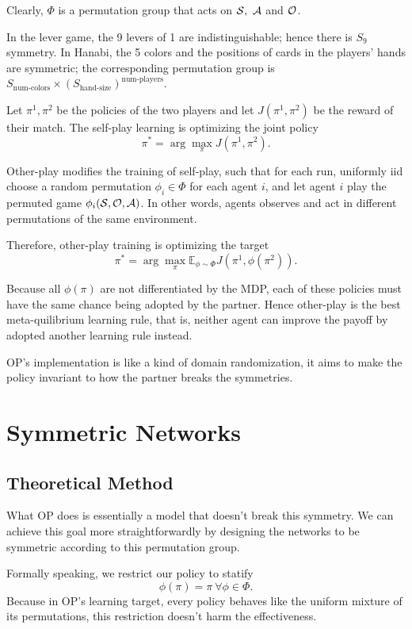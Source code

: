 \documentclass[12pt]{article}
\begin{document}
\begin{spacing}{1.15}
Clearly, $\Phi$ is a permutation group that acts on ${\mathcal S},~{\mathcal A}$ and ${\mathcal O}$.

In the lever game, the 9 levers of 1 are indistinguishable; hence there is $S_9$ symmetry. In Hanabi, the 5 colors and the positions of cards in the players' hands are symmetric; the corresponding permutation group is $S_{\text{num-colors}}\times (S_{\text{hand-size}})^{\text{num-players}}$.

Let $\pi^1, \pi^2$ be the policies of the two players and let $J(\pi^1, \pi^2)$ be the reward of their match. The self-play learning is optimizing the joint policy \[\pi^* = \arg\max_{\pi} J(\pi^1, \pi^2).\]

Other-play modifies the training of self-play, such that for each run, uniformly iid choose a random permutation $\phi_i\in\Phi$ for each agent $i$, and let agent $i$ play the permuted game $\phi_i({\mathcal S},{\mathcal O},{\mathcal A})$. In other words, agents observes and act in different permutations of the same environment.

Therefore, other-play training is optimizing the target \[\pi^* = \arg\max_{\pi} \mathbb{E}_{\phi\sim \Phi} J(\pi^1, \phi(\pi^2)).\]

Because all $\phi(\pi)$ are not differentiated by the MDP, each of these policies must have the same chance being adopted by the partner. Hence other-play is the best meta-quilibrium learning rule, that is, neither agent can improve the payoff by adopted another learning rule instead.

OP's implementation is like a kind of domain randomization, it aims to make the policy invariant to how the partner breaks the symmetries.

\section{Symmetric Networks}
\subsection{Theoretical Method}

What OP does is essentially a model that doesn't break this symmetry. We can achieve this goal more straightforwardly by designing the networks to be symmetric according to this permutation group.

Formally speaking, we restrict our policy to statify \[\phi(\pi)=\pi~\forall\phi\in\Phi.\] Because in OP's learning target, every policy behaves like the uniform mixture of its permutations, this restriction doesn't harm the effectiveness.


\end{spacing}
\end{document}
